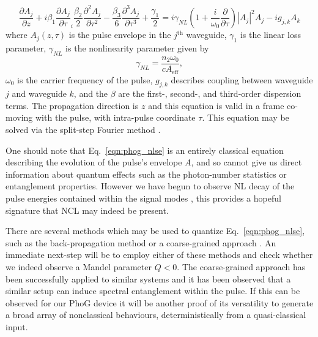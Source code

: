 \begin{equation}\label{eqn:phog_nlse}
\frac{\partial A_j}{\partial z} + i \beta_1 \frac{\partial A_j}{\partial \tau} _ i \frac{\beta_2}{2} \frac{\partial^2 A_j}{\partial \tau^2} - \frac{\beta_3}{6} \frac{\partial^3 A_j}{\partial \tau^3} + \frac{\gamma_1}{2} = i \gamma_{NL} \left( 1 + \frac{i}{\omega_0} \frac{\partial}{\partial \tau}\right)\left|A_j\right|^2 A_j - i g_{j, k} A_k
\end{equation}
where $A_j\left(z, \tau\right)$ is the pulse envelope in the $j^{\text{th}}$ waveguide, $\gamma_1$ is the linear loss parameter, $\gamma_{NL}$ is the nonlinearity parameter given by
\begin{equation}
\gamma_{NL} = \frac{n_2 \omega_0}{c A_{\text{eff}}},
\end{equation}
$\omega_0$ is the carrier frequency of the pulse, $g_{j, k}$ describes coupling between waveguide $j$ and waveguide $k$, and the $\beta$ are the first-, second-, and third-order dispersion terms. The propagation direction is $z$ and this equation is valid in a frame co-moving with the pulse, with intra-pulse coordinate $\tau$. This equation may be solved via the split-step Fourier method \cite{Agrawal2007}.

One should note that Eq.~\ref{eqn:phog_nlse} is an entirely classical equation describing the evolution of the pulse's envelope $A$, and so cannot give us direct information about quantum effects such as the photon-number statistics or entanglement properties. However we have begun to observe NL decay of the pulse energies contained within the signal modes \cite{Thornton2019a}, this provides a hopeful signature that NCL may indeed be present.

There are several methods which may be used to quantize Eq.~\ref{eqn:phog_nlse}, such as the back-propagation method \cite{Lai1995, Hosaka2015, Mecozzi1997} or a coarse-grained approach \cite{Hosaka2016, Nishizawa1999, Fiorentino2002, Ju2012, Doerr1994}. An immediate next-step will be to employ either of these methods and check whether we indeed observe a Mandel parameter $Q < 0$. The coarse-grained approach has been successfully applied to similar systems and it has been observed \cite{Ju2012} that a similar setup can induce spectral entanglement within the pulse. If this can be observed for our PhoG device it will be another proof of its versatility to generate a broad array of nonclassical behaviours, deterministically from a quasi-classical input.


